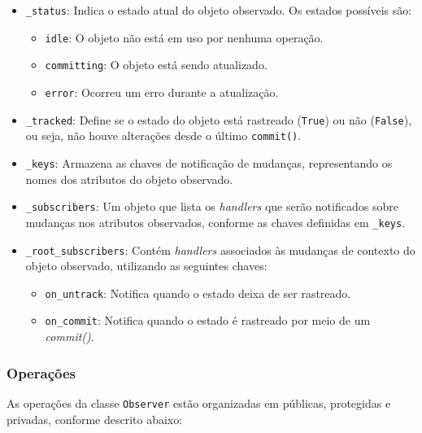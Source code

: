 \begin{itemize}
    \item \texttt{\_status}: Indica o estado atual do objeto observado. Os estados possíveis são:
    \begin{itemize}
        \item \texttt{idle}: O objeto não está em uso por nenhuma operação.
        \item \texttt{committing}: O objeto está sendo atualizado.
        \item \texttt{error}: Ocorreu um erro durante a atualização.
    \end{itemize}
    \item \texttt{\_tracked}: Define se o estado do objeto está rastreado (\texttt{True}) ou não (\texttt{False}), ou seja, não houve alterações desde o último \texttt{commit()}.
    \item \texttt{\_keys}: Armazena as chaves de notificação de mudanças, representando os nomes dos atributos do objeto observado.
    \item \texttt{\_subscribers}: Um objeto que lista os \textit{handlers} que serão notificados sobre mudanças nos atributos observados, conforme as chaves definidas em \texttt{\_keys}.
    \item \texttt{\_root\_subscribers}: Contém \textit{handlers} associados às mudanças de contexto do objeto observado, utilizando as seguintes chaves:
    \begin{itemize}
        \item \texttt{on\_untrack}: Notifica quando o estado deixa de ser rastreado.
        \item \texttt{on\_commit}: Notifica quando o estado é rastreado por meio de um \textit{commit()}.
    \end{itemize}
\end{itemize}

\subsubsection{Operações}

As operações da classe \texttt{Observer} estão organizadas em públicas, protegidas e privadas, conforme descrito abaixo:

